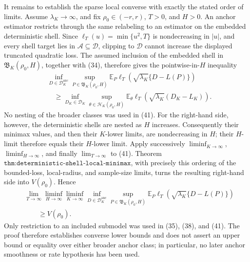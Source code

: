 It remains to establish the sparse local converse with exactly the stated
order of limits.  Assume \(\lambda_K\to\infty\), and fix
\(\rho_0\in(-r,r)\), \(T>0\), and \(H>0\).  An anchor estimator restricts
through the same relabeling to an estimator on the embedded deterministic
shell.  Since
\(\ell_T(u)=\min\{u^2,T\}\) is nondecreasing in \(|u|\), and every shell
target lies in \(\mathcal A\subseteq\mathcal D\), clipping to
\(\mathcal D\) cannot increase the displayed truncated quadratic loss.
The assumed inclusion of the embedded shell in
\(\mathfrak B_K(\rho_0,H)\), together with (34), therefore gives the
pointwise-in-\(H\) inequality
\[
\begin{aligned}
 &\inf_{D\in\mathscr D_K^{\mathrm{anc}}}
 \sup_{P\in\mathfrak B_K(\rho_0,H)}
 \mathbb E_P\ell_T\!\left(
 \sqrt{\lambda_K}\{D-L(P)\}\right)\\
 &\quad\geq
 \inf_{D_K\in\mathscr D_K}
 \sup_{\theta\in\mathcal H_K(\rho_0,H)}
 \mathbb E_\theta\ell_T\!\left(
 \sqrt{\lambda_K}(D_K-L_K)\right).
\end{aligned}
 \tag{41}
\]
No nesting of the broader classes was used in (41).  For the right-hand
side, however, the deterministic shells are nested as \(H\) increases.
Consequently their minimax values, and then their \(K\)-lower limits, are
nondecreasing in \(H\); their \(H\)-limit therefore equals their
\(H\)-lower limit.  Apply successively
\(\liminf_{K\to\infty}\), \(\liminf_{H\to\infty}\), and finally
\(\lim_{T\to\infty}\) to (41).  Theorem
\(\texttt{thm:deterministic-shell-local-minimax}\), with precisely this
ordering of the bounded-loss, local-radius, and sample-size limits, turns
the resulting right-hand side into \(V(\rho_0)\).  Hence
\[
\begin{aligned}
 &\lim_{T\to\infty}\liminf_{H\to\infty}\liminf_{K\to\infty}
 \inf_{D\in\mathscr D_K^{\mathrm{anc}}}
 \sup_{P\in\mathfrak B_K(\rho_0,H)}
 \mathbb E_P\ell_T\!\left(
 \sqrt{\lambda_K}\{D-L(P)\}\right)\\
 &\qquad\geq V(\rho_0).
\end{aligned}
 \tag{42}
\]
Only restriction to an included submodel was used in (35), (38), and
(41).  The proof therefore establishes converse lower bounds and does not
assert an upper bound or equality over either broader anchor class; in
particular, no later anchor smoothness or rate hypothesis has been used.
